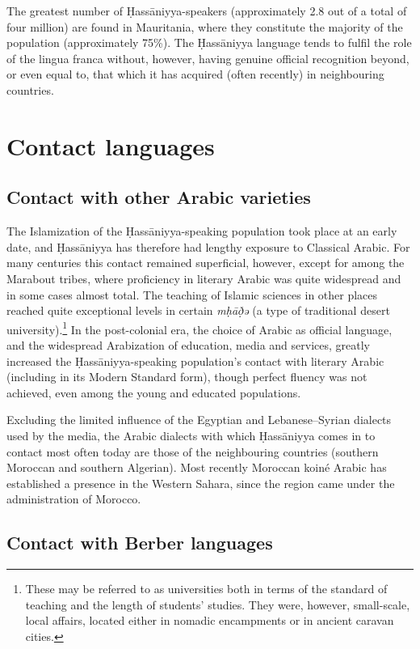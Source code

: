 \documentclass[output=paper]{langsci/langscibook}
\begin{document}
The greatest number of Ḥassāniyya-speakers (approximately 2.8 out of a total of four million) are found in Mauritania, where they constitute the majority of the population (approximately 75\%). The Ḥassāniyya language tends to fulfil the role of the lingua franca without, however, having genuine official recognition beyond, or even equal to, that which it has acquired (often recently) in neighbouring countries.

\section{Contact languages} %

\subsection{Contact with other Arabic varieties} %

The Islamization of the Ḥassāniyya-speaking population took place at an early date, and Ḥassāniyya has therefore had lengthy exposure to Classical Arabic. For many centuries this contact remained superficial, however, except for among the Marabout tribes, where proficiency in literary Arabic was quite widespread and in some cases almost total. The teaching of Islamic sciences in other places reached quite exceptional levels in certain \textit{mḥāð̣ə{\R}} (a type of traditional desert university).\footnote{These may be referred to as universities both in terms of the standard of teaching and the length of students’ studies. They were, however, small-scale, local affairs, located either in nomadic encampments or in ancient caravan cities.} In the post-colonial era, the choice of Arabic as official language, and the widespread Arabization of education, media and services, greatly increased the Ḥassāniyya-speaking population’s contact with literary Arabic (including in its Modern Standard form), though perfect fluency was not achieved, even among the young and educated populations. 

Excluding the limited influence of the Egyptian and Lebanese–Syrian dialects used by the media, the Arabic dialects with which Ḥassāniyya comes in to contact most often today are those of the neighbouring countries (southern Moroccan and southern Algerian). Most recently Moroccan koiné Arabic has established a presence in the Western Sahara, since the region came under the administration of Morocco.

\subsection{Contact with Berber languages} %
\end{document}
